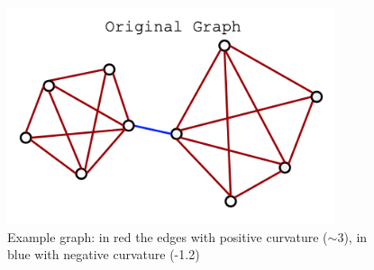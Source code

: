 \documentclass[10pt, aspectratio = 169]{beamer}
\begin{document}
\begin{frame}
\begin{columns}
\begin{column}{0.6\textwidth}
        \end{column}
        \begin{column}{0.4\textwidth}
            \begin{figure}
                \includegraphics[width=0.9\textwidth]{figures/original_graph.png}
                \caption{\scriptsize Example graph: in red the edges with positive curvature ($\sim 3$), 
                in blue with negative curvature (-1.2) \cite[Attali al., 2024]{attali2024delaunay}}
            \end{figure}
        \end{column}
    \end{columns}
\end{frame}
\end{document}
